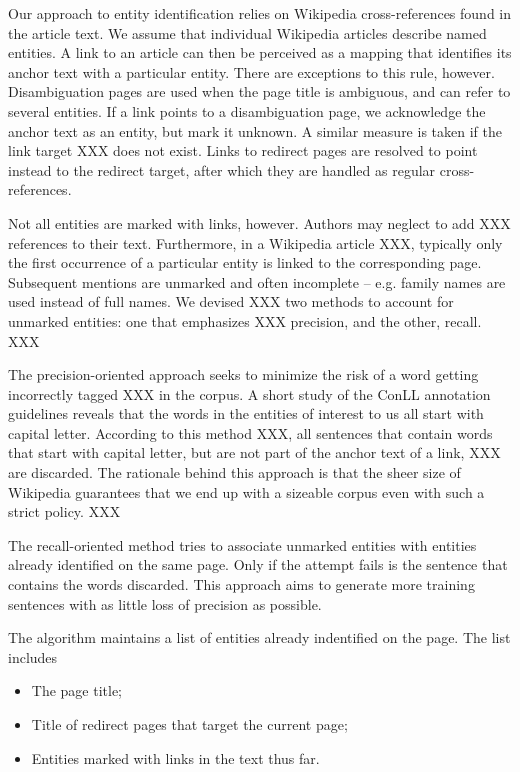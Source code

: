\documentclass[11pt]{article}
\begin{document}
Our approach to entity identification relies on Wikipedia cross-references found in the article text. We assume that individual Wikipedia articles describe named entities. A link to an article can then be perceived as a mapping that identifies its anchor text with a particular entity. There are exceptions to this rule, however. Disambiguation pages are used when the page title is ambiguous, and can refer to several entities. If a link points to a disambiguation page, we acknowledge the anchor text as an entity, but mark it unknown. A similar measure is taken if the link target XXX does not exist. Links to redirect pages are resolved to point instead to the redirect target, after which they are handled as regular cross-references.

Not all entities are marked with links, however. Authors may neglect to add XXX references to their text. Furthermore, in a Wikipedia article XXX, typically only the first occurrence of a particular entity is linked to the corresponding page. Subsequent mentions are unmarked and often incomplete -- e.g. family names are used instead of full names. We devised XXX two methods to account for unmarked entities: one that emphasizes XXX precision, and the other, recall. XXX


The precision-oriented approach seeks to minimize the risk of a word getting incorrectly tagged XXX in the corpus. A short study of the ConLL annotation guidelines reveals that the words in the entities of interest to us all start with capital letter. According to this method XXX, all sentences that contain words that start with capital letter, but are not part of the anchor text of a link, XXX are discarded. The rationale behind this approach is that the sheer size of Wikipedia guarantees that we end up with a sizeable corpus even with such a strict policy. XXX

The recall-oriented method tries to associate unmarked entities with entities already identified on the same page. Only if the attempt fails is the sentence that contains the words discarded. This approach aims to generate more training sentences with as little loss of precision as possible. 

The algorithm maintains a list of entities already indentified on the page. The list includes
\begin{itemize}
\item The page title; %
\item Title of redirect pages that target the current page; %
\item Entities marked with links in the text thus far.
\end{itemize}
\end{document}
